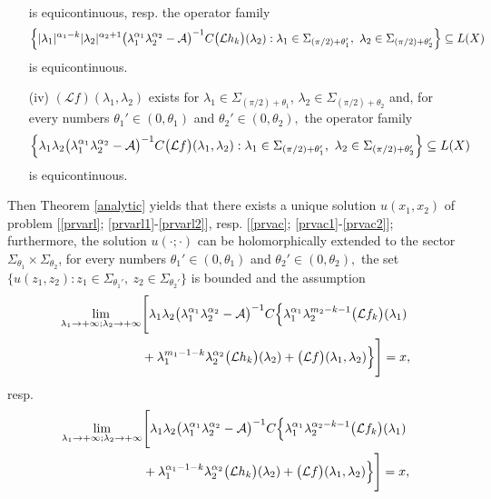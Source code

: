 \documentclass{amsart}
\theoremstyle{definition}
\theoremstyle{remark}
\numberwithin{equation}{section}
\begin{document}
\begin{itemize}
{\begin{align*}
\end{align*}}
is equicontinuous,
resp.
the operator family{\small
\begin{align*}
\Bigl\{ |\lambda_{1}|^{\alpha_{1}-k}|\lambda_{2}|^{\alpha_{2}+1}\bigl( \lambda_{1}^{\alpha_{1}} \lambda_{2}^{\alpha_{2}} -{\mathcal A}\bigr)^{-1}C \bigl({\mathcal L}h_{k}\bigr)(\lambda_{2}): \lambda_{1}\in \Sigma_{(\pi/2)+\theta_{1}'},\ \lambda_{2}\in \Sigma_{(\pi/2)+\theta_{2}'}\Bigr\}\subseteq L(X)
\end{align*}}
is equicontinuous.
\item[(iv)] $({\mathcal L}f)(\lambda_{1},\lambda_{2})$ exists for $  \lambda_{1} \in \Sigma_{(\pi/2)+\theta_{1}}$, $  \lambda_{2}\in \Sigma_{(\pi/2)+\theta_{2}}$ and, for every numbers $\theta_{1}' \in (0,\theta_{1})$ and $\theta_{2}' \in (0,\theta_{2}),$ the operator family
\begin{align*}
\Bigl\{ \lambda_{1}\lambda_{2}\bigl( \lambda_{1}^{\alpha_{1}} \lambda_{2}^{\alpha_{2}} -{\mathcal A}\bigr)^{-1}C\bigl( {\mathcal L}f\bigr)(\lambda_{1},\lambda_{2}) : \lambda_{1}\in \Sigma_{(\pi/2)+\theta_{1}'},\ \lambda_{2}\in \Sigma_{(\pi/2)+\theta_{2}'}\Bigr\}\subseteq L(X)
\end{align*}
is equicontinuous.
\end{itemize}
Then Theorem \ref{analytic} yields that there exists a unique solution $u(x_{1},x_{2})$ of problem [\eqref{prvarl}; \eqref{prvarl1}-\eqref{prvarl2}], resp. [\eqref{prvac}; \eqref{prvac1}-\eqref{prvac2}]; furthermore, the solution $u(\cdot;\cdot)$ can be holomorphically extended to the sector $\Sigma_{\theta_{1}} \times \Sigma_{\theta_{2}}$, for every numbers $\theta_{1}' \in (0,\theta_{1})$ and $\theta_{2}' \in (0,\theta_{2}),$ the set $\{u(z_{1},z_{2}) : z_{1}\in \Sigma_{\theta_{1}'},\ z_{2}\in \Sigma_{\theta_{2}'} \}$ is bounded and the assumption
\begin{align*}
\lim_{\lambda_{1}\rightarrow +\infty; \lambda_{2}\rightarrow +\infty}&\Biggl[ \lambda_{1}\lambda_{2}\bigl( \lambda_{1}^{\alpha_{1}} \lambda_{2}^{\alpha_{2}} -{\mathcal A}\bigr)^{-1}C\Bigl\{ \lambda_{1}^{\alpha_{1}}\lambda_{2}^{m_{2}-k-1}\bigl({\mathcal L}f_{k}\bigr)(\lambda_{1})\\& +\lambda_{1}^{m_{1}-1-k}\lambda_{2}^{\alpha_{2}}\bigl({\mathcal L}h_{k}\bigr)(\lambda_{2})+\bigl( {\mathcal L}f\bigr)(\lambda_{1},\lambda_{2})\Bigr\}\Biggr]=x,
\end{align*}
resp.
\begin{align*}
\lim_{\lambda_{1}\rightarrow +\infty; \lambda_{2}\rightarrow +\infty}&\Biggl[ \lambda_{1}\lambda_{2}\bigl( \lambda_{1}^{\alpha_{1}} \lambda_{2}^{\alpha_{2}} -{\mathcal A}\bigr)^{-1}C\Bigl\{ \lambda_{1}^{\alpha_{1}}\lambda_{2}^{\alpha_{2}-k-1}\bigl({\mathcal L}f_{k}\bigr)(\lambda_{1})\\& +\lambda_{1}^{\alpha_{1}-1-k}\lambda_{2}^{\alpha_{2}}\bigl({\mathcal L}h_{k}\bigr)(\lambda_{2})+\bigl( {\mathcal L}f\bigr)(\lambda_{1},\lambda_{2})\Bigr\}\Biggr]=x,
\end{align*}
\end{document}
